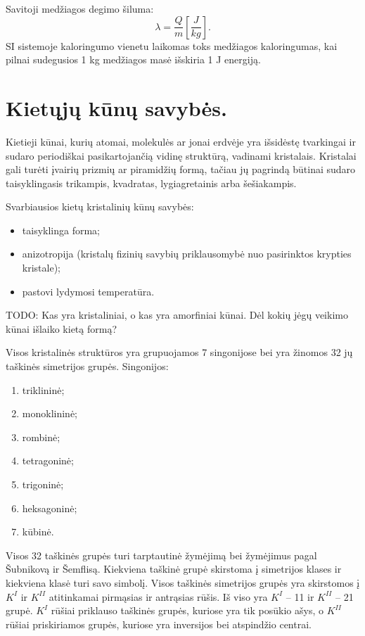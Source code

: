 Savitoji medžiagos degimo šiluma:
\begin{equation*}
  \lambda = \frac{Q}{m} \left[ \frac{J}{kg} \right].
\end{equation*}
SI sistemoje kaloringumo vienetu laikomas toks medžiagos kaloringumas,
kai pilnai sudegusios 1 kg medžiagos masė išskiria 1 J energiją.

\section{Kietųjų kūnų savybės.}

Kietieji kūnai, kurių atomai, molekulės ar jonai erdvėje yra
išsidėstę tvarkingai ir sudaro periodiškai pasikartojančią vidinę
struktūrą, vadinami kristalais. Kristalai gali turėti įvairių
prizmių ar piramidžių formą, tačiau jų pagrindą būtinai sudaro
taisyklingasis trikampis, kvadratas, lygiagretainis arba šešiakampis.

Svarbiausios kietų kristalinių kūnų savybės:
\begin{itemize}
  \item taisyklinga forma;
  \item anizotropija (kristalų fizinių savybių priklausomybė nuo
    pasirinktos krypties kristale);
  \item pastovi lydymosi temperatūra.
\end{itemize}

TODO: Kas yra kristaliniai, o kas yra amorfiniai kūnai. Dėl kokių
jėgų veikimo kūnai išlaiko kietą formą?

Visos kristalinės struktūros yra grupuojamos 7 singonijose bei
yra žinomos 32 jų taškinės simetrijos grupės. Singonijos:
\begin{enumerate}
  \item triklininė;
  \item monoklininė;
  \item rombinė;
  \item tetragoninė;
  \item trigoninė;
  \item heksagoninė;
  \item kūbinė.
\end{enumerate}

Visos 32 taškinės grupės turi tarptautinė žymėjimą bei žymėjimus
pagal Šubnikovą ir Šemflisą. Kiekviena taškinė grupė skirstoma
į simetrijos klases ir kiekviena klasė turi savo simbolį.
Visos taškinės simetrijos grupės yra skirstomos į $K^{I}$ ir $K^{II}$
atitinkamai pirmąsias ir antrąsias rūšis. Iš viso yra
$K^{I}$ – 11 ir $K^{II}$ – 21 grupė. $K^{I}$ rūšiai priklauso
taškinės grupės, kuriose yra tik posūkio ašys, o $K^{II}$
rūšiai priskiriamos grupės, kuriose yra inversijos bei atspindžio
centrai.

